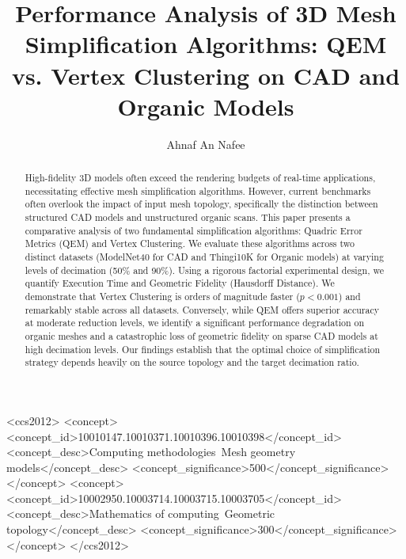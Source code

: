 \documentclass[sigconf,review]{acmart}
\begin{document}
\title{Performance Analysis of 3D Mesh Simplification Algorithms: QEM vs. Vertex Clustering on CAD and Organic Models}

\author{Ahnaf An Nafee}

\begin{abstract}
High-fidelity 3D models often exceed the rendering budgets of real-time applications, necessitating effective mesh simplification algorithms. However, current benchmarks often overlook the impact of input mesh topology, specifically the distinction between structured CAD models and unstructured organic scans. This paper presents a comparative analysis of two fundamental simplification algorithms: Quadric Error Metrics (QEM) and Vertex Clustering. We evaluate these algorithms across two distinct datasets (ModelNet40 for CAD and Thingi10K for Organic models) at varying levels of decimation (50\% and 90\%). Using a rigorous factorial experimental design, we quantify Execution Time and Geometric Fidelity (Hausdorff Distance). We demonstrate that Vertex Clustering is orders of magnitude faster ($p < 0.001$) and remarkably stable across all datasets. Conversely, while QEM offers superior accuracy at moderate reduction levels, we identify a significant performance degradation on organic meshes and a catastrophic loss of geometric fidelity on sparse CAD models at high decimation levels. Our findings establish that the optimal choice of simplification strategy depends heavily on the source topology and the target decimation ratio.
\end{abstract}

\begin{CCSXML}
<ccs2012>
   <concept>
       <concept_id>10010147.10010371.10010396.10010398</concept_id>
       <concept_desc>Computing methodologies~Mesh geometry models</concept_desc>
       <concept_significance>500</concept_significance>
       </concept>
   <concept>
       <concept_id>10002950.10003714.10003715.10003705</concept_id>
       <concept_desc>Mathematics of computing~Geometric topology</concept_desc>
       <concept_significance>300</concept_significance>
       </concept>
 </ccs2012>
\end{CCSXML}


\end{document}
